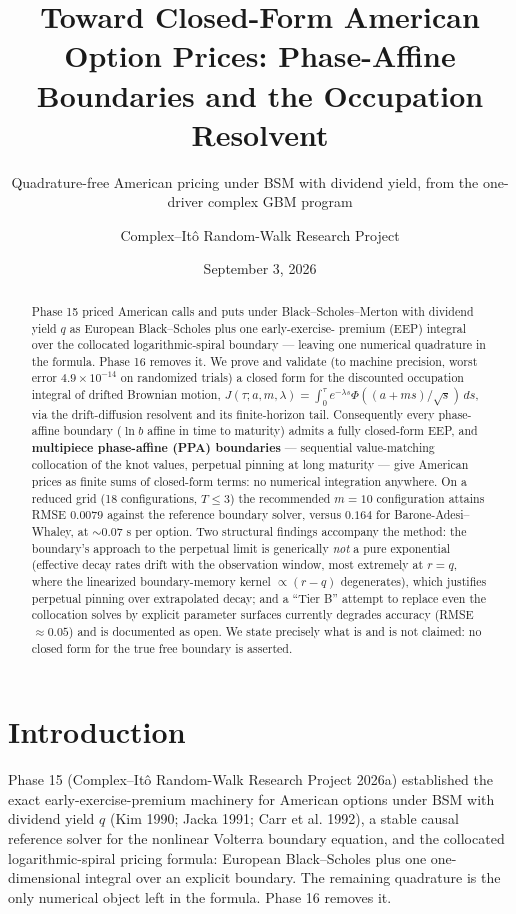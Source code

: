 \documentclass[
  english,
  10pt,
  letterpaper,
  DIV=11,
  numbers=noendperiod]{scrartcl}
\title{Toward Closed-Form American Option Prices: Phase-Affine
Boundaries and the Occupation Resolvent}
\subtitle{Quadrature-free American pricing under BSM with dividend
yield, from the one-driver complex GBM program}
\author{Complex--Itô Random-Walk Research Project}
\date{September 3, 2026}
\renewcommand*\contentsname{Table of contents}
\newcommand\contentsname{Table of contents}
\begin{document}
\maketitle
\begin{abstract}
Phase 15 priced American calls and puts under Black--Scholes--Merton
with dividend yield \(q\) as European Black--Scholes plus one
early-exercise- premium (EEP) integral over the collocated
logarithmic-spiral boundary --- leaving one numerical quadrature in the
formula. Phase 16 removes it. We prove and validate (to machine
precision, worst error \(4.9\times10^{-14}\) on randomized trials) a
closed form for the discounted occupation integral of drifted Brownian
motion, \(J(\tau;a,m,\lambda)=\int_0^\tau e^{-\lambda s}
\Phi((a+ms)/\sqrt s)\,ds\), via the drift-diffusion resolvent and its
finite-horizon tail. Consequently every phase-affine boundary (\(\ln b\)
affine in time to maturity) admits a fully closed-form EEP, and
\textbf{multipiece phase-affine (PPA) boundaries} --- sequential
value-matching collocation of the knot values, perpetual pinning at long
maturity --- give American prices as finite sums of closed-form terms:
no numerical integration anywhere. On a reduced grid (18 configurations,
\(T\le3\)) the recommended \(m=10\) configuration attains RMSE
\(0.0079\) against the reference boundary solver, versus \(0.164\) for
Barone-Adesi--Whaley, at \(\sim0.07\) s per option. Two structural
findings accompany the method: the boundary's approach to the perpetual
limit is generically \emph{not} a pure exponential (effective decay
rates drift with the observation window, most extremely at \(r=q\),
where the linearized boundary-memory kernel \(\propto(r-q)\)
degenerates), which justifies perpetual pinning over extrapolated decay;
and a ``Tier B'' attempt to replace even the collocation solves by
explicit parameter surfaces currently degrades accuracy (RMSE
\(\approx0.05\)) and is documented as open. We state precisely what is
and is not claimed: no closed form for the true free boundary is
asserted.
\end{abstract}

\renewcommand*\contentsname{Table of contents}
{
\setcounter{tocdepth}{1}
\tableofcontents
}

\section{Introduction}\label{sec-introduction}

Phase 15 (Complex--Itô Random-Walk Research Project 2026a) established
the exact early-exercise-premium machinery for American options under
BSM with dividend yield \(q\) (Kim 1990; Jacka 1991; Carr et al. 1992),
a stable causal reference solver for the nonlinear Volterra boundary
equation, and the collocated logarithmic-spiral pricing formula:
European Black--Scholes plus one one-dimensional integral over an
explicit boundary. The remaining quadrature is the only numerical object
left in the formula. Phase 16 removes it.
\end{document}
